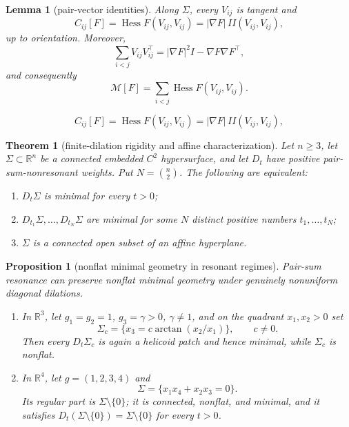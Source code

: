 \documentclass[10pt,a4paper]{amsart}
\newtheorem{lemma}{Lemma}
\newtheorem{theorem}{Theorem}
\newtheorem{proposition}{Proposition}
\begin{document}
\begin{lemma}[pair-vector identities]\label{lem:pairvectors}
Along $\Sigma$, every $V_{ij}$ is tangent and
\begin{equation}\label{eq:CijII}
C_{ij}[F]=\operatorname{Hess}F(V_{ij},V_{ij})=|\nabla F|\,II(V_{ij},V_{ij}),
\end{equation}
up to orientation. Moreover,
\begin{equation}\label{eq:traceidentity}
\sum_{i<j}V_{ij}V_{ij}^{\!\top}=|\nabla F|^2I-\nabla F\nabla F^{\!\top},
\end{equation}
and consequently
\begin{equation}\label{eq:minop-pairs}
\mathcal M[F]=\sum_{i<j}\operatorname{Hess}F(V_{ij},V_{ij}).
\end{equation}
\end{lemma}

\begin{equation}
C_{ij}[F]=\operatorname{Hess}F(V_{ij},V_{ij})=|\nabla F|\,II(V_{ij},V_{ij}),
\end{equation}

\begin{theorem}[finite-dilation rigidity and affine characterization]\label{thm:main}
Let $n\ge3$, let $\Sigma\subset\mathbb R^n$ be a connected embedded $C^2$ hypersurface, and let $D_t$ have positive pair-sum-nonresonant weights. Put $N=\binom n2$. The following are equivalent:
\begin{enumerate}
\item $D_t\Sigma$ is minimal for every $t>0$;
\item $D_{t_1}\Sigma,\ldots,D_{t_N}\Sigma$ are minimal for some $N$ distinct positive numbers $t_1,\ldots,t_N$;
\item $\Sigma$ is a connected open subset of an affine hyperplane.
\end{enumerate}
\end{theorem}

\begin{proposition}[nonflat minimal geometry in resonant regimes]\label{prop:resonance}
Pair-sum resonance can preserve nonflat minimal geometry under genuinely nonuniform diagonal dilations.
\begin{enumerate}
\item In $\mathbb R^3$, let $g_1=g_2=1$, $g_3=\gamma>0$, $\gamma\ne1$, and on the quadrant $x_1,x_2>0$ set
\begin{equation}\label{eq:helicoid}
\Sigma_c=\{x_3=c\arctan(x_2/x_1)\},\qquad c\ne0.
\end{equation}
Then every $D_t\Sigma_c$ is again a helicoid patch and hence minimal, while $\Sigma_c$ is nonflat.
\item In $\mathbb R^4$, let $g=(1,2,3,4)$ and
\begin{equation}\label{eq:cone}
\Sigma=\{x_1x_4+x_2x_3=0\}.
\end{equation}
Its regular part is $\Sigma\setminus\{0\}$; it is connected, nonflat, and minimal, and it satisfies $D_t(\Sigma\setminus\{0\})=\Sigma\setminus\{0\}$ for every $t>0$.
\end{enumerate}
\end{proposition}
\end{document}
